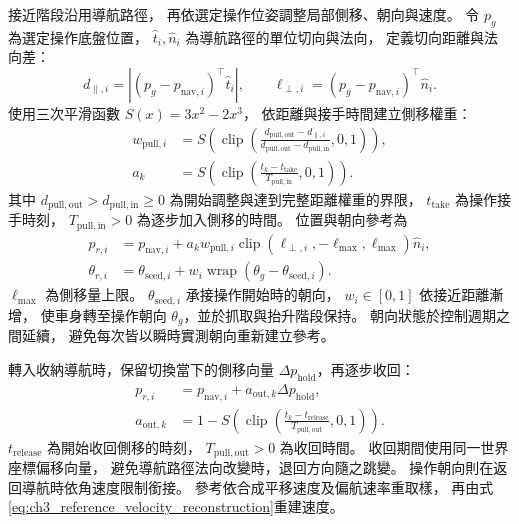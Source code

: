接近階段沿用導航路徑，
再依選定操作位姿調整局部側移、朝向與速度。
令 $p_g$ 為選定操作底盤位置，
$\hat t_i,\hat n_i$ 為導航路徑的單位切向與法向，
定義切向距離與法向差：
\begin{equation}
    d_{\parallel,i}
    =|(p_g-p_{\mathrm{nav},i})^\top\hat t_i|,
    \qquad
    \ell_{\perp,i}
    =(p_g-p_{\mathrm{nav},i})^\top\hat n_i.
    \label{eq:ch3_navigation_pull_geometry}
\end{equation}
使用三次平滑函數 $S(x)=3x^2-2x^3$，
依距離與接手時間建立側移權重：
\begin{equation}
    \begin{aligned}
        w_{\mathrm{pull},i}
        &=S\!\left(\operatorname{clip}
        \left(\frac{d_{\mathrm{pull,out}}-d_{\parallel,i}}
        {d_{\mathrm{pull,out}}-d_{\mathrm{pull,in}}},0,1\right)\right),\\
        a_k&=S\!\left(\operatorname{clip}
        \left(\frac{t_k-t_{\mathrm{take}}}{T_{\mathrm{pull,in}}},0,1\right)\right).
    \end{aligned}
    \label{eq:ch3_navigation_pull_weight}
\end{equation}
其中 $d_{\mathrm{pull,out}}>d_{\mathrm{pull,in}}\geq0$
為開始調整與達到完整距離權重的界限，
$t_{\mathrm{take}}$ 為操作接手時刻，
$T_{\mathrm{pull,in}}>0$ 為逐步加入側移的時間。
位置與朝向參考為
\begin{equation}
    \begin{aligned}
        p_{r,i}&=p_{\mathrm{nav},i}
        +a_k w_{\mathrm{pull},i}
        \operatorname{clip}(\ell_{\perp,i},-\ell_{\max},\ell_{\max})\hat n_i,\\
        \theta_{r,i}&=\theta_{\mathrm{seed},i}
        +w_i\operatorname{wrap}(\theta_g-\theta_{\mathrm{seed},i}).
    \end{aligned}
    \label{eq:ch3_navigation_local_pull}
\end{equation}
$\ell_{\max}$ 為側移量上限。
$\theta_{\mathrm{seed},i}$ 承接操作開始時的朝向，
$w_i\in[0,1]$ 依接近距離漸增，
使車身轉至操作朝向 $\theta_g$，並於抓取與抬升階段保持。
朝向狀態於控制週期之間延續，
避免每次皆以瞬時實測朝向重新建立參考。

轉入收納導航時，保留切換當下的側移向量
$\Delta p_{\mathrm{hold}}$，再逐步收回：
\begin{equation}
    \begin{aligned}
        p_{r,i}&=p_{\mathrm{nav},i}
        +a_{\mathrm{out},k}\Delta p_{\mathrm{hold}},\\
        a_{\mathrm{out},k}
        &=1-S\!\left(\operatorname{clip}
        \left(\frac{t_k-t_{\mathrm{release}}}{T_{\mathrm{pull,out}}},0,1\right)\right).
    \end{aligned}
    \label{eq:ch3_navigation_pull_release}
\end{equation}
$t_{\mathrm{release}}$ 為開始收回側移的時刻，
$T_{\mathrm{pull,out}}>0$ 為收回時間。
收回期間使用同一世界座標偏移向量，
避免導航路徑法向改變時，退回方向隨之跳變。
操作朝向則在返回導航時依角速度限制銜接。
參考依合成平移速度及偏航速率重取樣，
再由式\eqref{eq:ch3_reference_velocity_reconstruction}重建速度。


